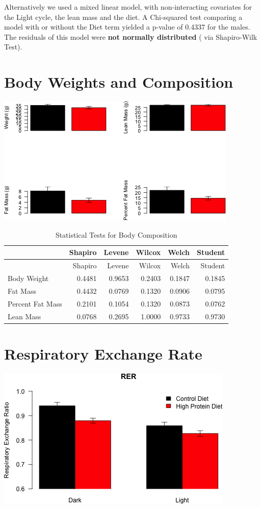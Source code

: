 \documentclass[]{article}
\begin{document}
Alternatively we used a mixed linear model, with non-interacting
covariates for the Light cycle, the lean mass and the diet. A
Chi-squared test comparing a model with or without the Diet term yielded
a p-value of 0.4337 for the males. The residuals of this model were
\textbf{not normally distributed} ( via Shapiro-Wilk Test).

\section{Body Weights and
Composition}\label{body-weights-and-composition}

\includegraphics{figures/body-composition-no-treatment-1.png}

\begin{longtable}[c]{@{}lrrrrr@{}}
\caption{Statistical Tests for Body Composition}\tabularnewline
\toprule
& Shapiro & Levene & Wilcox & Welch & Student\tabularnewline
\midrule
\endfirsthead
\toprule
& Shapiro & Levene & Wilcox & Welch & Student\tabularnewline
\midrule
\endhead
Body Weight & 0.4481 & 0.9653 & 0.2403 & 0.1847 & 0.1845\tabularnewline
Fat Mass & 0.4432 & 0.0769 & 0.1320 & 0.0906 & 0.0795\tabularnewline
Percent Fat Mass & 0.2101 & 0.1054 & 0.1320 & 0.0873 &
0.0762\tabularnewline
Lean Mass & 0.0768 & 0.2695 & 1.0000 & 0.9733 & 0.9730\tabularnewline
\bottomrule
\end{longtable}

\section{Respiratory Exchange Rate}\label{respiratory-exchange-rate}

\includegraphics{figures/rer-barplot-1.png}
\end{document}
